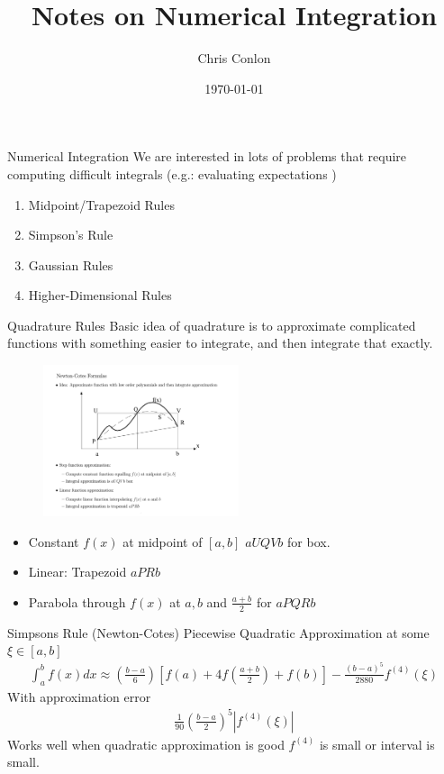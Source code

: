 \documentclass[xcolor=pdftex,dvipsnames,table,mathserif]{beamer}
\title{Notes on Numerical Integration}
\author{Chris Conlon  }
\institute{Grad IO}
\date{\today }
\begin{document}
\begin{frame}
\titlepage
\end{frame}


\begin{frame}{Numerical Integration}
We are interested in lots of problems that require computing difficult integrals (e.g.: evaluating expectations )
\begin{enumerate}
\item Midpoint/Trapezoid Rules
\item Simpson's Rule
\item Gaussian Rules
\item Higher-Dimensional Rules
\end{enumerate}
\end{frame}


\begin{frame}{Quadrature Rules}
Basic idea of quadrature is to approximate complicated functions with something easier to integrate, and then integrate that exactly.\\
\begin{figure}[htbp]
\begin{center}
\includegraphics[height=1.75in]{quadrature.pdf}
\end{center}
\end{figure}
\begin{itemize}
\item Constant $f(x)$ at midpoint of $[a,b]$ $aUQVb$ for box.
\item Linear: Trapezoid $a PRb$
\item Parabola through $f(x)$ at $a,b$ and $\frac{a+b}{2}$ for $aPQRb$
\end{itemize}
\end{frame}

\begin{frame}{Simpsons Rule (Newton-Cotes)}
Piecewise Quadratic Approximation at some $\xi \in[a,b]$
\begin{eqnarray*}
\int_{a}^b f(x) d x \approx \left(\frac{b-a}{6} \right) \left[f(a) + 4f \left( \frac{a+b}{2} \right) + f(b) \right]  - \frac{(b-a)^5}{2880} f^{(4)} (\xi)
\end{eqnarray*}
With approximation error
\begin{eqnarray*}
\frac{1}{90} \left( \frac{b-a}{2}\right)^5 | f^{(4)} (\xi) |
\end{eqnarray*}
Works well when quadratic approximation is good $f^{(4)}$ is small or interval is small.
\end{frame}
\end{document}
